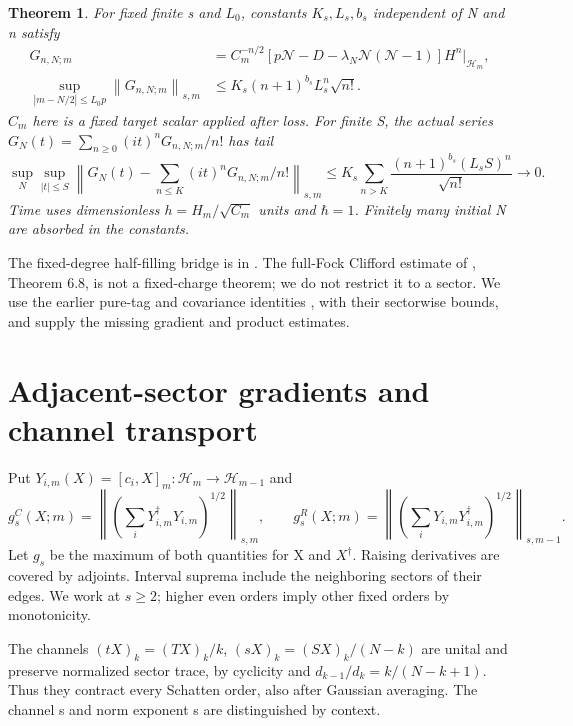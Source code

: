 \documentclass[11pt]{article}
\newcommand{\Ncal}{\mathcal N}
\newcommand{\norm}[1]{\left\lVert#1\right\rVert}
\newcommand{\Hh}{\mathcal H}
\newtheorem{theorem}{Theorem}
\begin{document}
\begin{theorem}\label{thm:tail}
For fixed finite s and $L_0$, constants $K_s,L_s,b_s$ independent of
N and n satisfy
\begin{align}
 G_{n,N;m}&=C_m^{-n/2}
 [p\Ncal-D-\lambda_N\Ncal(\Ncal-1)]H^n\big|_{\Hh_m},\nonumber\\
 \sup_{|m-N/2|\le L_0p}\norm{G_{n,N;m}}_{s,m}
 &\le K_s(n+1)^{b_s}L_s^n\sqrt{n!}.\label{eq:main}
\end{align}
$C_m$ here is a fixed target scalar applied after loss. For finite S,
the actual series $G_N(t)=\sum_{n\ge0}(it)^nG_{n,N;m}/n!$ has tail
\[
 \sup_N\sup_{|t|\le S}
 \norm{G_N(t)-\sum_{n\le K}(it)^nG_{n,N;m}/n!}_{s,m}
 \le K_s\sum_{n>K}\frac{(n+1)^{b_s}(L_sS)^n}{\sqrt{n!}}
 \longrightarrow0. \tag{T}
\]
Time uses dimensionless $h=H_m/\sqrt{C_m}$ units and $\hbar=1$.
Finitely many initial N are absorbed in the constants.
\end{theorem}

The fixed-degree half-filling bridge is in \cite{central}. The
full-Fock Clifford estimate of \cite{belp}, Theorem 6.8, is not a
fixed-charge theorem; we do not restrict it to a sector. We use
the earlier pure-tag and covariance identities
\cite{diagram,operator,charged}, with their sectorwise bounds,
and supply the missing gradient and product estimates.

\section{Adjacent-sector gradients and channel transport}
Put $Y_{i,m}(X)=[c_i,X]_m:\Hh_m\to\Hh_{m-1}$ and
\[
 g_s^C(X;m)=\norm{(\sum_iY_{i,m}^\dagger Y_{i,m})^{1/2}}_{s,m},
 \qquad
 g_s^R(X;m)=\norm{(\sum_iY_{i,m}Y_{i,m}^\dagger)^{1/2}}_{s,m-1}.
\]
Let $g_s$ be the maximum of both quantities for X and $X^\dagger$.
Raising derivatives are covered by adjoints. Interval suprema
include the neighboring sectors of their edges. We work at $s\ge2$;
higher even orders imply other fixed orders by monotonicity.

The channels $(tX)_k=(TX)_k/k$, $(sX)_k=(SX)_k/(N-k)$ are unital
and preserve normalized sector trace, by cyclicity and
$d_{k-1}/d_k=k/(N-k+1)$. Thus they contract every Schatten order,
also after Gaussian averaging. The channel s and norm exponent s
are distinguished by context.
\end{document}
